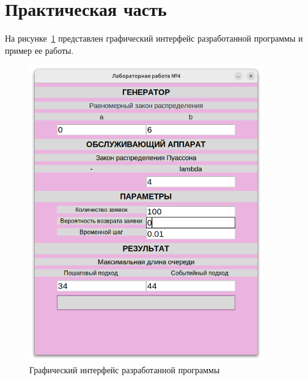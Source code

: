 \section{Практическая часть}

На рисунке~\ref{img:interface} представлен графический интерфейс разработанной программы и пример ее работы.

\begin{figure}[!htb]\centering
	\includegraphics[width=0.9\textwidth]{../img/interface.png}
	\caption{Графический интерфейс разработанной программы}
	\label{img:interface}
\end{figure}
